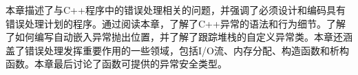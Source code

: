 本章描述了与C++程序中的错误处理相关的问题，并强调了必须设计和编码具有错误处理计划的程序。通过阅读本章，了解了C++异常的语法和行为细节。了解了如何编写自动嵌入异常抛出位置，并了解了跟踪堆栈的自定义异常类。本章还涵盖了错误处理发挥重要作用的一些领域，包括I/O流、内存分配、构造函数和析构函数。本章最后讨论了函数可提供的异常安全类型。